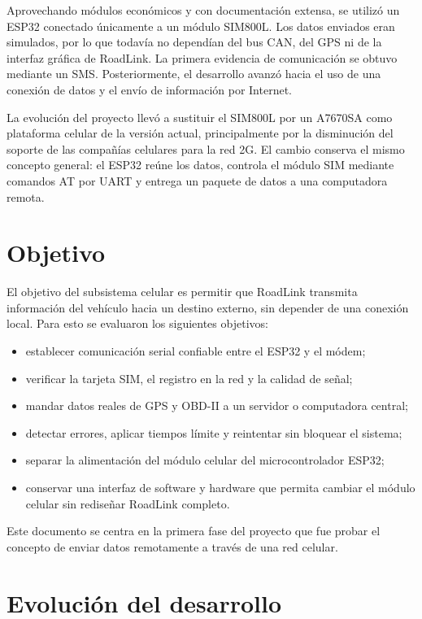 \documentclass[11pt,letterpaper]{article}
\begin{document}
Aprovechando módulos económicos y con documentación extensa, se utilizó
un ESP32 conectado únicamente a un módulo SIM800L. Los datos enviados eran
simulados, por lo que todavía no dependían del bus CAN, del GPS ni de la interfaz
gráfica de RoadLink. La primera evidencia de comunicación se obtuvo mediante un
SMS. Posteriormente, el desarrollo avanzó hacia el uso de una conexión de datos
y el envío de información por Internet.

La evolución del proyecto llevó a sustituir el SIM800L por un A7670SA como
plataforma celular de la versión actual, principalmente por la disminución del soporte de las compañías celulares para la red 2G. El cambio conserva el mismo concepto
general: el ESP32 reúne los datos, controla el módulo SIM mediante comandos AT por
UART y entrega un paquete de datos a una computadora remota.

\section{Objetivo}

El objetivo del subsistema celular es permitir que RoadLink transmita
información del vehículo hacia un destino externo, sin depender de una conexión
local. Para esto se evaluaron los siguientes objetivos:

\begin{itemize}
  \item establecer comunicación serial confiable entre el ESP32 y el módem;
  \item verificar la tarjeta SIM, el registro en la red y la calidad de señal;
  \item mandar datos reales de GPS y OBD-II a un servidor o computadora central;
  \item detectar errores, aplicar tiempos límite y reintentar sin bloquear el sistema;
  \item separar la alimentación del módulo celular del microcontrolador ESP32;
  \item conservar una interfaz de software y hardware que permita cambiar el módulo celular sin rediseñar RoadLink completo.
\end{itemize}

Este documento se centra en la primera fase del proyecto que fue probar el concepto de enviar datos remotamente a través de una red celular.

\section{Evolución del desarrollo}
\end{document}
